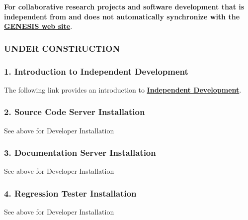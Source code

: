 \documentclass[12pt]{article}
\begin{document}
{\bf For collaborative research projects and software development that is independent from and does not automatically synchronize with the \href{http://www.genesis-sim.org/}{\bf GENESIS web site}}.

\subsubsection*{UNDER CONSTRUCTION}

\subsubsection*{1. Introduction to Independent Development}

The following link provides an introduction to \href{../developer-intro/developer-intro.tex}{\bf Independent Development}.

\subsubsection*{2. Source Code Server Installation}

See above for Developer Installation

\subsubsection*{3. Documentation Server Installation}

See above for Developer Installation

\subsubsection*{4. Regression Tester Installation}

See above for Developer Installation
\end{document}
